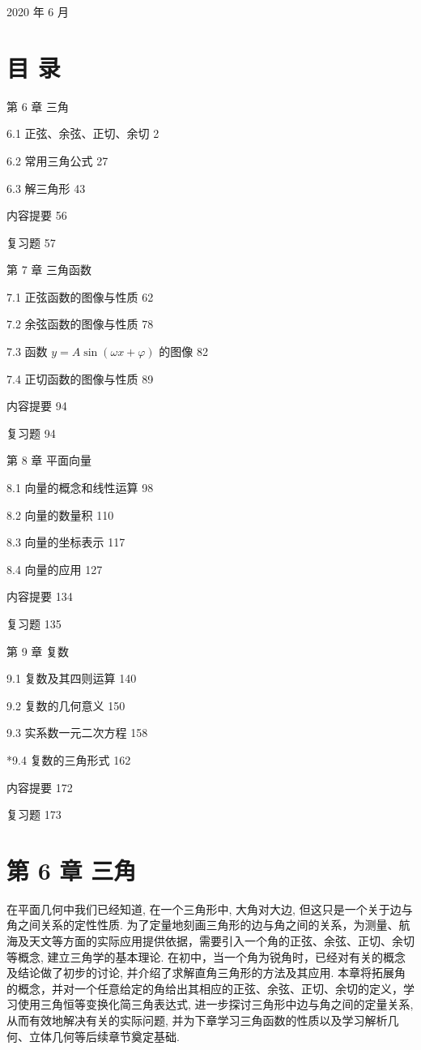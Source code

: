 \documentclass[10pt]{article}
\begin{document}
2020 年 6 月

\section*{目 录}

第 6 章 三角

6.1 正弦、余弦、正切、余切 2

6.2 常用三角公式 27

6.3 解三角形 43

内容提要 56

复习题 57

第 7 章 三角函数

7.1 正弦函数的图像与性质 62

7.2 余弦函数的图像与性质 78

7.3 函数 \(y = A\sin \left( {{\omega x} + \varphi }\right)\) 的图像 82

7.4 正切函数的图像与性质 89

内容提要 94

复习题 94

第 8 章 平面向量

8.1 向量的概念和线性运算 98

8.2 向量的数量积 110

8.3 向量的坐标表示 117

8.4 向量的应用 127

内容提要 134

复习题 135

第 9 章 复数

9.1 复数及其四则运算 140

9.2 复数的几何意义 150

9.3 实系数一元二次方程 158

*9.4 复数的三角形式 162

内容提要 172

复习题 173

\section*{第 6 章 三角}

在平面几何中我们已经知道, 在一个三角形中, 大角对大边, 但这只是一个关于边与角之间关系的定性性质. 为了定量地刻画三角形的边与角之间的关系，为测量、航海及天文等方面的实际应用提供依据，需要引入一个角的正弦、余弦、正切、余切等概念, 建立三角学的基本理论. 在初中，当一个角为锐角时，已经对有关的概念及结论做了初步的讨论, 并介绍了求解直角三角形的方法及其应用. 本章将拓展角的概念，并对一个任意给定的角给出其相应的正弦、余弦、正切、余切的定义，学习使用三角恒等变换化简三角表达式, 进一步探讨三角形中边与角之间的定量关系, 从而有效地解决有关的实际问题, 并为下章学习三角函数的性质以及学习解析几何、立体几何等后续章节奠定基础.
\end{document}
